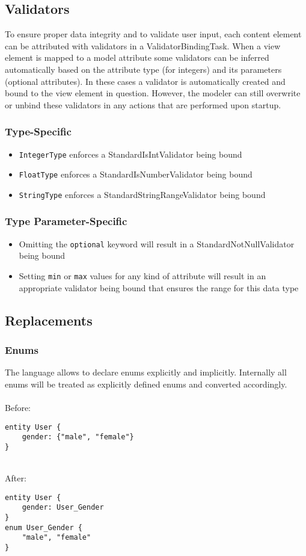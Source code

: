 \subsection{Validators}
To ensure proper data integrity and to validate user input, each content element can be attributed with validators in a ValidatorBindingTask. When a view element is mapped to a model attribute some validators can be inferred automatically based on the attribute type (\eg for integers) and its parameters (\eg optional attributes). In these cases a validator is automatically created and bound to the view element in question. However, the modeler can still overwrite or unbind these validators in any actions that are performed upon startup.

\subsubsection{Type-Specific}
\begin{itemize}
\item \lstinline!IntegerType! enforces a StandardIsIntValidator being bound
\item \lstinline!FloatType! enforces a StandardIsNumberValidator being bound
\item \lstinline!StringType! enforces a StandardStringRangeValidator being bound
\end{itemize}

\subsubsection{Type Parameter-Specific}

\begin{itemize}
\item Omitting the \lstinline!optional! keyword will result in a StandardNotNullValidator being bound
\item Setting \lstinline!min! or \lstinline!max! values for any kind of attribute will result in an appropriate validator being bound that ensures the range for this data type
\end{itemize}

\subsection{Replacements}
\subsubsection{Enums}
The \MD language allows to declare enums explicitly and implicitly. Internally all enums will be treated as explicitly defined enums and converted accordingly. \\ \\
Before:
\begin{lstlisting}[language=MD2]
entity User {
	gender: {"male", "female"}
}
\end{lstlisting}
~
\\
After:
\begin{lstlisting}[language=MD2]
entity User {
	gender: User_Gender
}
enum User_Gender {
	"male", "female"
}
\end{lstlisting}


